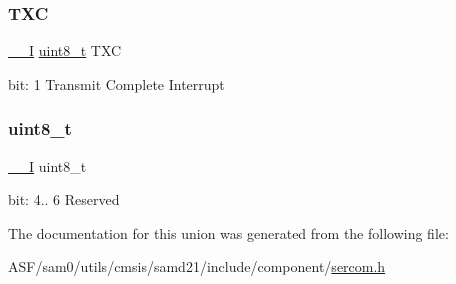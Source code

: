 \subsubsection{\texorpdfstring{TXC}{TXC}}
{\footnotesize\ttfamily \mbox{\hyperlink{core__cm0plus_8h_af63697ed9952cc71e1225efe205f6cd3}{\+\_\+\+\_\+I}} \mbox{\hyperlink{union_s_e_r_c_o_m___s_p_i___i_n_t_f_l_a_g___type_a5b4208c6f4c4a4290c4f2804d1eb1d5b}{uint8\+\_\+t}} T\+XC}

bit\+: 1 Transmit Complete Interrupt \mbox{\label{union_s_e_r_c_o_m___s_p_i___i_n_t_f_l_a_g___type_a5b4208c6f4c4a4290c4f2804d1eb1d5b}} 
\subsubsection{\texorpdfstring{uint8\_t}{uint8\_t}}
{\footnotesize\ttfamily \mbox{\hyperlink{core__cm0plus_8h_af63697ed9952cc71e1225efe205f6cd3}{\+\_\+\+\_\+I}} uint8\+\_\+t}

bit\+: 4.. 6 Reserved 

The documentation for this union was generated from the following file\+:\begin{DoxyCompactItemize}
\item 
A\+S\+F/sam0/utils/cmsis/samd21/include/component/\mbox{\hyperlink{utils_2cmsis_2samd21_2include_2component_2sercom_8h}{sercom.\+h}}\end{DoxyCompactItemize}
